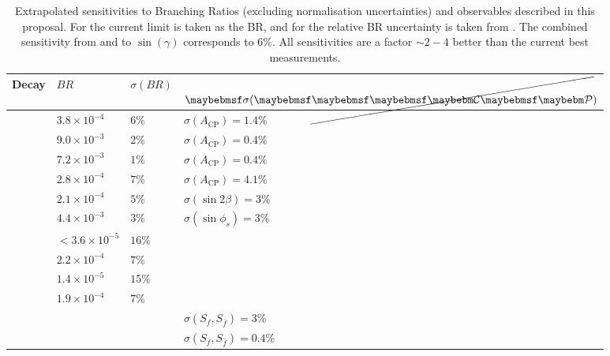 \documentclass[11pt,a4paper]{article}
\begin{document}
\begin{table}
\centering
\begin{tabular}{llll}
        Decay & $BR$ & $\sigma(BR) $ & $\sigma(\CPv)$ \\\hline
        \HepProcess{\PBminus\to\PDminus\PDzero} & $3.8\times10^{-4}$ & $6\%$ & $\sigma(A_{\text{CP}})=1.4\%$\\
        \HepProcess{\PBminus\to\PDsminus\PDzero} & $9.0\times10^{-3}$& $2\%$  & $\sigma(A_{\text{CP}})=0.4\%$\\
        \HepProcess{\APBzero\to\PDsminus\PDplus} & $7.2\times10^{-3}$ & $1\%$  & $\sigma(A_{\text{CP}})=0.4\%$\\
        \HepProcess{\APBs\to\PDminus\PDsplus} & $2.8\times10^{-4}$& $7\%$ & $\sigma(A_{\text{CP}})=4.1\%$\\
        \HepProcess{\PBzero\to\PDminus\PDplus} &$2.1\times10^{-4}$& $5\%$ & $\sigma(\sin2\beta)=3\%$\\
        \HepProcess{\PBs\to\PDsminus\PDsplus} &$4.4\times10^{-3}$& $3\%$ & $\sigma(\sin\phi_s)=3\%$\\
        \HepProcess{\PBzero\to\PDsminus\PDsplus} & $<3.6\times10^{-5}$& $16\%$ & \\
        \HepProcess{\PBs\to\PDminus\PDplus} & $2.2\times10^{-4}$& $7\%$ & \\
        \HepProcess{\PBzero\to\APDzero\PDzero} & $1.4\times10^{-5}$& $15\%$ & \\
        \HepProcess{\PBs\to\APDzero\PDzero} &$1.9\times10^{-4}$& $7\%$ & \\
        \HepProcess{\PBs\to\PDsmp\PKpm} & & & $\sigma(S_{f},S_{\bar{f}})=3\%$ \\
        \HepProcess{\PBzero\to\PDmp\Ppipm} & & & $\sigma(S_{f},S_{\bar{f}})=0.4\%$\\
        \end{tabular}\caption{Extrapolated sensitivities to Branching Ratios (excluding normalisation uncertainties) and \CPv observables described in this proposal. For \HepProcess{\PBzero\to\PDsminus\PDsplus} the current limit is taken as the BR, and for  \HepProcess{\PBminus\to\PDminus\PDzero} the relative BR uncertainty is taken from \HepProcess{\PBminus\to\PDsminus\PDzero}. The combined sensitivity from \HepProcess{\PBs\to\PDs\PK} and \HepProcess{\PBzero\to\PD\Ppi} to $\sin(\gamma)$ corresponds to 6\%. All sensitivities are a factor $\sim2-4$ better than the current best measurements.}
\label{tab:sens}
\end{table}
\end{document}
